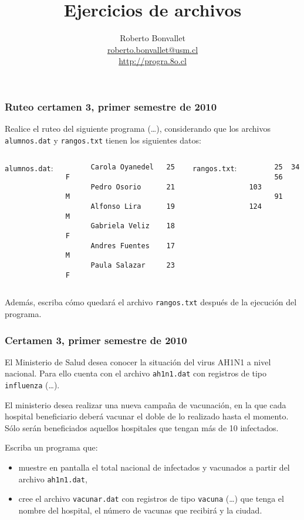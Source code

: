 \documentclass[12pt]{beamer}
\title{Ejercicios de archivos}
\author{
  Roberto Bonvallet \\
  \url{roberto.bonvallet@usm.cl} \\
  \url{http://progra.8o.cl}
}
\begin{document}
  \begin{frame}
    \maketitle
  \end{frame}

  \begin{frame}[fragile]
    \frametitle{Ruteo certamen 3, primer semestre de 2010}
    Realice el ruteo del siguiente programa (\ldots),
    considerando que los archivos
    \texttt{alumnos.dat} y \texttt{rangos.txt}
    tienen los siguientes datos:
    \vspace{2ex}

    \begin{columns}[t]
      \texttt{alumnos.dat}:
      \begin{Verbatim}
      Carola Oyanedel   25  F
      Pedro Osorio      21  M
      Alfonso Lira      19  M
      Gabriela Veliz    18  F
      Andres Fuentes    17  M
      Paula Salazar     23  F
      \end{Verbatim}
      \texttt{rangos.txt}:
      \begin{Verbatim}
      25  34
      56  103
      91  124
      \end{Verbatim}
    \end{columns}
    \vspace{2ex}

    Además, escriba cómo quedará el archivo \texttt{rangos.txt}
    después de la ejecución del programa.

\end{frame}

  \begin{frame}
    \frametitle{Certamen 3, primer semestre de 2010}
    El Ministerio de Salud desea conocer la situación
    del virus AH1N1 a nivel nacional.
    Para ello cuenta con el archivo \texttt{ah1n1.dat}
    con registros de tipo \texttt{influenza} (\ldots).

    El ministerio desea realizar una nueva campaña de vacunación,
    en la que cada hospital beneficiario
    deberá vacunar el doble de lo realizado hasta el momento.
    Sólo serán beneficiados aquellos hospitales
    que tengan más de 10 infectados.

    Escriba un programa que:
    \begin{itemize}
      \item muestre en pantalla el total nacional de infectados
        y vacunados a partir del archivo \texttt{ah1n1.dat},
      \item cree el archivo \texttt{vacunar.dat}
        con registros de tipo \texttt{vacuna} (\ldots)
        que tenga el nombre del hospital,
        el número de vacunas que recibirá
        y la ciudad.
    \end{itemize}

  \end{frame}
\end{document}

